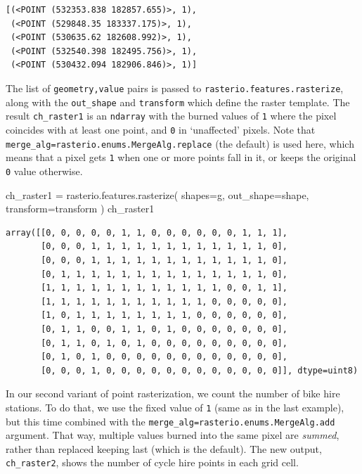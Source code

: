 \documentclass[
  letterpaper,
]{krantz}
\newenvironment{Shaded}{\begin{snugshade}}{\end{snugshade}}
\newcommand{\NormalTok}[1]{\textcolor[rgb]{0.00,0.23,0.31}{#1}}
\newcommand{\OperatorTok}[1]{\textcolor[rgb]{0.37,0.37,0.37}{#1}}
\begin{document}
\begin{verbatim}
[(<POINT (532353.838 182857.655)>, 1),
 (<POINT (529848.35 183337.175)>, 1),
 (<POINT (530635.62 182608.992)>, 1),
 (<POINT (532540.398 182495.756)>, 1),
 (<POINT (530432.094 182906.846)>, 1)]
\end{verbatim}

The list of \texttt{geometry,value} pairs is passed to
\texttt{rasterio.features.rasterize}, along with the \texttt{out\_shape}
and \texttt{transform} which define the raster template. The result
\texttt{ch\_raster1} is an \texttt{ndarray} with the burned values of
\texttt{1} where the pixel coincides with at least one point, and
\texttt{0} in `unaffected' pixels. Note that
\texttt{merge\_alg=rasterio.enums.MergeAlg.replace} (the default) is
used here, which means that a pixel gets \texttt{1} when one or more
points fall in it, or keeps the original \texttt{0} value otherwise.

\begin{Shaded}
\begin{Highlighting}[]
\NormalTok{ch\_raster1 }\OperatorTok{=}\NormalTok{ rasterio.features.rasterize(}
\NormalTok{    shapes}\OperatorTok{=}\NormalTok{g,}
\NormalTok{    out\_shape}\OperatorTok{=}\NormalTok{shape, }
\NormalTok{    transform}\OperatorTok{=}\NormalTok{transform}
\NormalTok{)}
\NormalTok{ch\_raster1}
\end{Highlighting}
\end{Shaded}

\begin{verbatim}
array([[0, 0, 0, 0, 0, 1, 1, 0, 0, 0, 0, 0, 0, 1, 1, 1],
       [0, 0, 0, 1, 1, 1, 1, 1, 1, 1, 1, 1, 1, 1, 1, 0],
       [0, 0, 0, 1, 1, 1, 1, 1, 1, 1, 1, 1, 1, 1, 1, 0],
       [0, 1, 1, 1, 1, 1, 1, 1, 1, 1, 1, 1, 1, 1, 1, 0],
       [1, 1, 1, 1, 1, 1, 1, 1, 1, 1, 1, 1, 0, 0, 1, 1],
       [1, 1, 1, 1, 1, 1, 1, 1, 1, 1, 1, 0, 0, 0, 0, 0],
       [1, 0, 1, 1, 1, 1, 1, 1, 1, 1, 0, 0, 0, 0, 0, 0],
       [0, 1, 1, 0, 0, 1, 1, 0, 1, 0, 0, 0, 0, 0, 0, 0],
       [0, 1, 1, 0, 1, 0, 1, 0, 0, 0, 0, 0, 0, 0, 0, 0],
       [0, 1, 0, 1, 0, 0, 0, 0, 0, 0, 0, 0, 0, 0, 0, 0],
       [0, 0, 0, 1, 0, 0, 0, 0, 0, 0, 0, 0, 0, 0, 0, 0]], dtype=uint8)
\end{verbatim}

In our second variant of point rasterization, we count the number of
bike hire stations. To do that, we use the fixed value of \texttt{1}
(same as in the last example), but this time combined with the
\texttt{merge\_alg=rasterio.enums.MergeAlg.add} argument. That way,
multiple values burned into the same pixel are \emph{summed}, rather
than replaced keeping last (which is the default). The new output,
\texttt{ch\_raster2}, shows the number of cycle hire points in each grid
cell.
\end{document}
